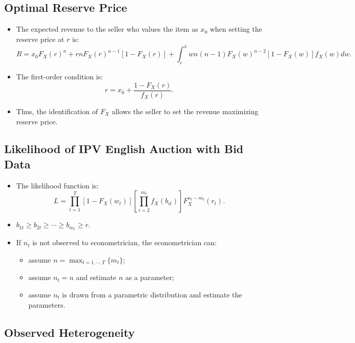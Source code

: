 \documentclass[
]{book}
\providecommand{\tightlist}{%
  \setlength{\itemsep}{0pt}\setlength{\parskip}{0pt}}
\begin{document}
\hypertarget{optimal-reserve-price}{%
\subsection{Optimal Reserve Price}\label{optimal-reserve-price}}

\begin{itemize}
\tightlist
\item
  The expected revenue to the seller who values the item as \(x_0\) when setting the reserve price at \(r\) is:
  \[
  R = x_0 F_X(r)^n + r n F_X(r)^{n - 1}[1 - F_X(r)] + \int_r^{\overline{x}} w n(n - 1)F_X(w)^{n - 2}[1 - F_X(w)] f_X(w) dw.
  \]
\item
  The first-order condition is:
  \[
  r = x_0 + \frac{1 - F_X(r)}{f_X(r)}.
  \]
\item
  Thus, the identification of \(F_X\) allows the seller to set the revenue maximizing reserve price.
\end{itemize}

\hypertarget{likelihood-of-ipv-english-auction-with-bid-data}{%
\subsection{Likelihood of IPV English Auction with Bid Data}\label{likelihood-of-ipv-english-auction-with-bid-data}}

\begin{itemize}
\tightlist
\item
  The likelihood function is:
  \[
  L = \prod_{t = 1}^T [1 - F_X(w_t)] \left[ \prod_{i = 2}^{m_t} f_X(b_{it}) \right] F_X^{n_t - m_t}(r_t).
  \]
\item
  \(b_{1t} \ge b_{2t} \ge \cdots \ge b_{m_t} \ge r\).
\item
  If \(n_t\) is not observed to econometrician, the econometrician can:

  \begin{itemize}
  \tightlist
  \item
    assume \(n = \max_{t = 1, \cdots, T} \{m_t\}\);
  \item
    assume \(n_t = n\) and estimate \(n\) as a parameter;
  \item
    assume \(n_t\) is drawn from a parametric distribution and estimate the parameters.
  \end{itemize}
\end{itemize}

\hypertarget{observed-heterogeneity}{%
\subsection{Observed Heterogeneity}\label{observed-heterogeneity}}
\end{document}

